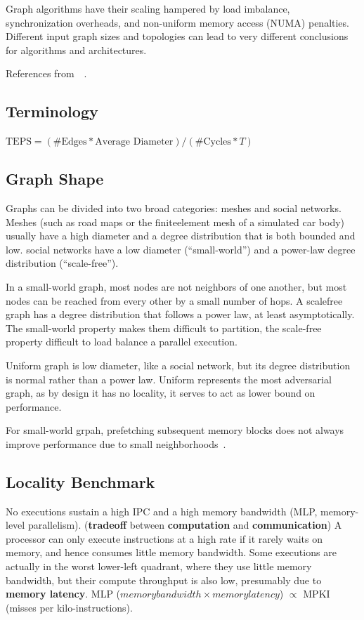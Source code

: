 \documentclass[UTF8,12pt,a4paper]{article}
\begin{document}
Graph algorithms have their scaling hampered by
load imbalance, synchronization overheads, and non-uniform memory access (NUMA) penalties.
Different input graph sizes and topologies can lead to
very different conclusions for algorithms and architectures.

References from~\cite{DBLP:conf/iiswc/BeamerAP15}~\cite{DBLP:conf/usenix/MalicevicLZ17}.

\subsection{Terminology}
\begin{compactitem}
  \item $\text{TEPS} = (\#\text{Edges} * \text{Average Diameter}) / (\#\text{Cycles} * T)$
\end{compactitem}

\subsection{Graph Shape}
Graphs can be divided into two broad categories: meshes and social networks.
Meshes (such as road maps or the finiteelement mesh of a simulated car body)
usually have a high diameter
and a degree distribution that is both bounded and low.
social networks have a low diameter (``small-world'')
and a power-law degree distribution (``scale-free'').

In a small-world graph, most nodes are not neighbors of one another,
but most nodes can be reached from every other by a small number of hops.
A scalefree graph has a degree distribution
that follows a power law, at least asymptotically.
The small-world property makes them difficult to partition,
the scale-free property difficult to load balance a parallel execution.

Uniform graph is low diameter, like a social network,
but its degree distribution is normal rather than a power law.
Uniform represents the most adversarial graph,
as by design it has no locality,
it serves to act as lower bound on performance.

For small-world grpah, prefetching subsequent memory blocks does not always
improve performance due to small neighborhoods~\cite{DBLP:journals/corr/abs-1903-06697}.

\subsection{Locality Benchmark}
No executions sustain a high IPC and a high memory bandwidth
(MLP, memory-level parallelism).
(\textbf{tradeoff} between \textbf{computation} and \textbf{communication})
A processor can only execute instructions at a high rate
if it rarely waits on memory, and hence consumes little memory bandwidth.
Some executions are actually in the worst lower-left quadrant,
where they use little memory bandwidth, but their compute throughput is also low,
presumably due to \textbf{memory latency}.
MLP ($memory bandwidth \times memory latency$) $\propto$ MPKI (misses per kilo-instructions).
\end{document}
